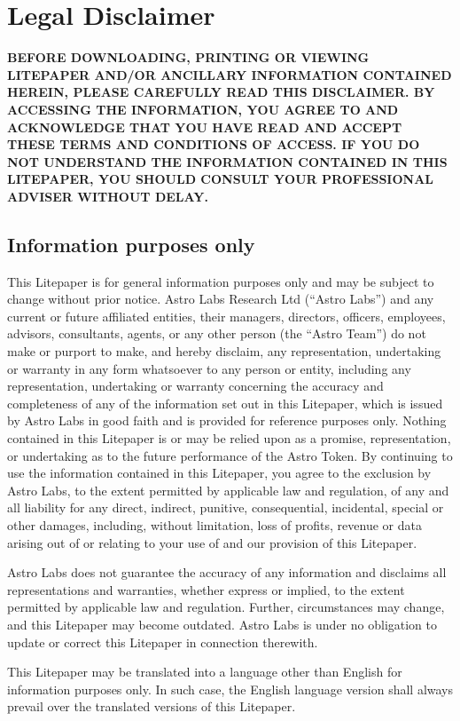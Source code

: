 \section{Legal Disclaimer}
\textbf{BEFORE DOWNLOADING, PRINTING OR VIEWING LITEPAPER AND/OR ANCILLARY INFORMATION CONTAINED HEREIN, PLEASE CAREFULLY READ THIS DISCLAIMER. BY ACCESSING THE INFORMATION, YOU AGREE TO AND ACKNOWLEDGE THAT YOU HAVE READ AND ACCEPT THESE TERMS AND CONDITIONS OF ACCESS. IF YOU DO NOT UNDERSTAND THE INFORMATION CONTAINED IN THIS LITEPAPER, YOU SHOULD CONSULT YOUR PROFESSIONAL ADVISER WITHOUT DELAY.}

\subsection{Information purposes only}
This Litepaper is for general information purposes only and may be subject to change without prior notice. Astro Labs Research Ltd (“Astro Labs”) and any current or future affiliated entities, their managers, directors, officers, employees, advisors, consultants, agents, or any other person (the “Astro Team”) do not make or purport to make, and hereby disclaim, any representation, undertaking or warranty in any form whatsoever to any person or entity, including any representation, undertaking or warranty concerning the accuracy and completeness of any of the information set out in this Litepaper, which is issued by Astro Labs in good faith and is provided for reference purposes only. Nothing contained in this Litepaper is or may be relied upon as a promise, representation, or undertaking as to the future performance of the Astro Token. By continuing to use the information contained in this Litepaper, you agree to the exclusion by Astro Labs, to the extent permitted by applicable law and regulation, of any and all liability for any direct, indirect, punitive, consequential, incidental, special or other damages, including, without limitation, loss of profits, revenue or data arising out of or relating to your use of and our provision of this Litepaper.

Astro Labs does not guarantee the accuracy of any information and disclaims all representations and warranties, whether express or implied, to the extent permitted by applicable law and regulation. Further, circumstances may change, and this Litepaper may become outdated. Astro Labs is under no obligation to update or correct this Litepaper in connection therewith.

This Litepaper may be translated into a language other than English for information purposes only. In such case, the English language version shall always prevail over the translated versions of this Litepaper.

